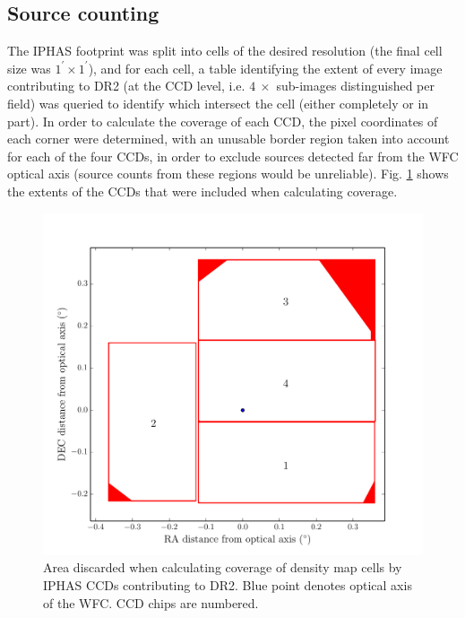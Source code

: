 \documentclass[a4paper,useAMS,usenatbib]{mn2e}
\begin{document}
\subsection{Source counting}
\label{subsec:counting}
The IPHAS footprint was split into cells of the desired resolution (the final cell size was $1^{\prime}\times1^{\prime}$), and for each cell, a table identifying the extent of every image contributing to DR2 (at the CCD level, i.e. $4~\times$ sub-images distinguished per field) was queried to identify which intersect the cell (either completely or in part). In order to calculate the coverage of each CCD, the pixel coordinates of each corner were determined, with an unusable border region taken into account for each of the four CCDs, in order to exclude sources detected far from the WFC optical axis (source counts from these regions would be unreliable). Fig. \ref{fig:ccd_coverage} shows the extents of the CCDs that were included when calculating coverage.

\begin{figure}
\begin{center}
\includegraphics[width=1\linewidth]{figures/ccd_coverage.pdf} 
\caption{\footnotesize Area discarded when calculating coverage of density map cells by IPHAS CCDs contributing to DR2. Blue point denotes optical axis of the WFC. CCD chips are numbered.}
\label{fig:ccd_coverage}
\end{center}
\end{figure}
\end{document}
